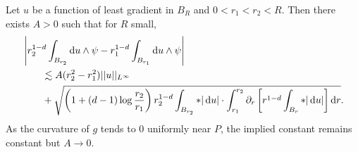 \begin{lemma}\label{bounding the G}
Let $u$ be a function of least gradient in $B_R$ and $0 < r_1 < r_2 < R$. Then there exists $A > 0$ such that for $R$ small,
\begin{align*}
&\left|r_2^{1 - d} \int_{B_{r_2}} \mathop{}\!\mathrm{d} u \wedge \psi - r_1^{1 - d} \int_{B_{r_1}} \mathop{}\!\mathrm{d} u \wedge \psi \right| \\
&\qquad \lesssim A(r_2^2 - r_1^2)||u||_{L^\infty} \\
&\qquad + \sqrt{\left(1 + (d - 1) \log \frac{r_2}{r_1}\right) r_2^{1 - d} \int_{B_{r_2}} *|\mathop{}\!\mathrm{d} u| \cdot \int_{r_1}^{r_2} \partial_r \left[r^{1 - d}\int_{B_r} *|\mathop{}\!\mathrm{d} u|\right] \mathop{}\!\mathrm{d} r}.
\end{align*}
As the curvature of $g$ tends to $0$ uniformly near $P$, the implied constant remains constant but $A \to 0$.
\end{lemma}

